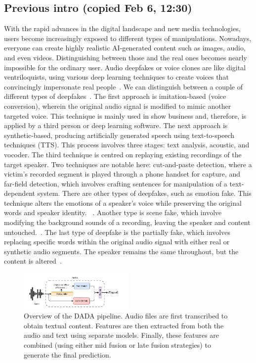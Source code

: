 \documentclass{Interspeech}
\begin{document}
\subsection{Previous intro (copied Feb 6, 12:30)}

With the rapid advances in the digital landscape and new media technologies,
users become increasingly exposed to different types of manipulations.
Nowadays, everyone can create highly realistic AI-generated content such as
images, audio, and even videos. Distinguishing between those and the real ones
becomes nearly impossible for the ordinary user. Audio deepfakes or voice
clones are like digital ventriloquists, using various deep learning techniques
to create voices that convincingly impersonate real people~\cite{adversarial}.
We can distinguish between a couple of different types of
deepfakes~\cite{review_audio_deepfake_issues}. The first approach is
imitation-based (voice conversion), wherein the original audio signal is
modified to mimic another targeted voice. This technique is mainly used in show
business and, therefore, is applied by a third person or deep learning
software. The next approach is synthetic-based, producing artificially
generated speech using text-to-speech techniques (TTS). This process involves
three stages: text analysis, acoustic, and vocoder. The third technique is
centred on replaying existing recordings of the target speaker. Two techniques
are notable here: cut-and-paste detection, where a victim's recorded segment is
played through a phone handset for capture, and far-field detection, which
involves crafting sentences for manipulation of a text-dependent system. There
are other types of deepfakes, such as emotion fake. This technique alters the
emotions of a speaker's voice while preserving the original words and speaker
identity. ~\cite{zhao2023emofake}. Another type is scene fake, which involve
modifying the background sounds of a recording, leaving the speaker and content
untouched.~\cite{yi2022scenefake}. The last type of deepfake is the partially
fake, which involves replacing specific words within the original audio signal
with either real or synthetic audio segments. The speaker remains the same
throughout, but the content is altered~\cite{yi2023halftruth}.

\begin{figure}[t]
  \centering
  \includegraphics[width=0.5\textwidth]{figures/overview.pdf}
  \caption{Overview of the DADA pipeline. Audio files are first transcribed to obtain textual content. Features are then extracted from both the audio and text using separate models. Finally, these features are combined (using either mid fusion or late fusion strategies) to generate the final prediction.}\label{fig:overview}
\end{figure}
\end{document}
